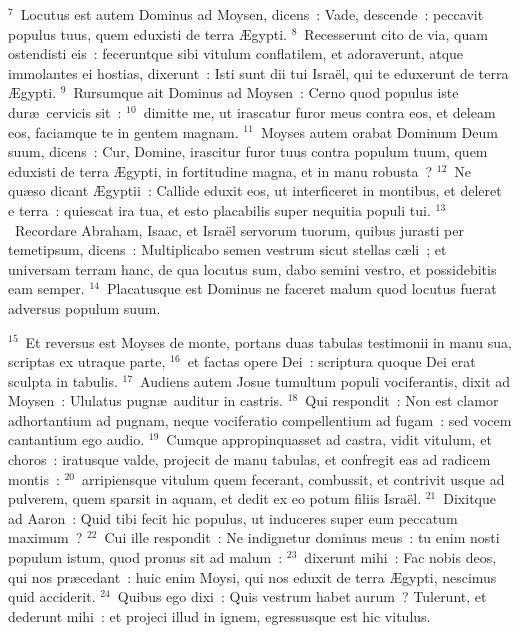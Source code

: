 ${}^{7}$~Locutus est autem Dominus ad Moysen, dicens~: Vade, descende~: peccavit populus tuus, quem eduxisti de terra \AE gypti.
${}^{8}$~Recesserunt cito de via, quam ostendisti eis~: feceruntque sibi vitulum conflatilem, et adoraverunt, atque immolantes ei hostias, dixerunt~: Isti sunt dii tui Isra\"el, qui te eduxerunt de terra \AE gypti.
${}^{9}$~Rursumque ait Dominus ad Moysen~: Cerno quod populus iste dur\ae\ cervicis sit~:
${}^{10}$~dimitte me, ut irascatur furor meus contra eos, et deleam eos, faciamque te in gentem magnam.
${}^{11}$~Moyses autem orabat Dominum Deum suum, dicens~: Cur, Domine, irascitur furor tuus contra populum tuum, quem eduxisti de terra \AE gypti, in fortitudine magna, et in manu robusta~?
${}^{12}$~Ne qu\ae so dicant \AE gyptii~: Callide eduxit eos, ut interficeret in montibus, et deleret e terra~: quiescat ira tua, et esto placabilis super nequitia populi tui.
${}^{13}$~Recordare Abraham, Isaac, et Isra\"el servorum tuorum, quibus jurasti per temetipsum, dicens~: Multiplicabo semen vestrum sicut stellas c\ae li~; et universam terram hanc, de qua locutus sum, dabo semini vestro, et possidebitis eam semper.
${}^{14}$~Placatusque est Dominus ne faceret malum quod locutus fuerat adversus populum suum.


${}^{15}$~Et reversus est Moyses de monte, portans duas tabulas testimonii in manu sua, scriptas ex utraque parte,
${}^{16}$~et factas opere Dei~: scriptura quoque Dei erat sculpta in tabulis.
${}^{17}$~Audiens autem Josue tumultum populi vociferantis, dixit ad Moysen~: Ululatus pugn\ae\ auditur in castris.
${}^{18}$~Qui respondit~: Non est clamor adhortantium ad pugnam, neque vociferatio compellentium ad fugam~: sed vocem cantantium ego audio.
${}^{19}$~Cumque appropinquasset ad castra, vidit vitulum, et choros~: iratusque valde, projecit de manu tabulas, et confregit eas ad radicem montis~:
${}^{20}$~arripiensque vitulum quem fecerant, combussit, et contrivit usque ad pulverem, quem sparsit in aquam, et dedit ex eo potum filiis Isra\"el.
${}^{21}$~Dixitque ad Aaron~: Quid tibi fecit hic populus, ut induceres super eum peccatum maximum~?
${}^{22}$~Cui ille respondit~: Ne indignetur dominus meus~: tu enim nosti populum istum, quod pronus sit ad malum~:
${}^{23}$~dixerunt mihi~: Fac nobis deos, qui nos pr\ae cedant~: huic enim Moysi, qui nos eduxit de terra \AE gypti, nescimus quid acciderit.
${}^{24}$~Quibus ego dixi~: Quis vestrum habet aurum~? Tulerunt, et dederunt mihi~: et projeci illud in ignem, egressusque est hic vitulus.


